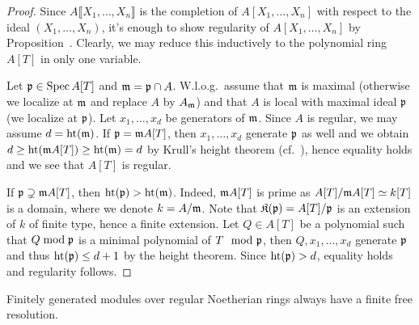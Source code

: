 \documentclass[a4paper,parskip=half,numbers=enddot, DIV=12]{scrreprt}
\begin{document}
\begin{proof}
	Since $A\llbracket X_1,\ldots,X_n\rrbracket$ is the completion of $A[X_1,\ldots,X_n]$ with respect to the ideal $(X_1,\ldots,X_n)$, it's enough to show regularity of $A[X_1,\ldots,X_n]$ by Proposition~. Clearly, we may reduce this inductively to the polynomial ring $A[T]$ in only one variable. 
	
	Let $\mathfrak{p}\in\operatorname{Spec} A[T]$ and $\mathfrak{m}=\mathfrak{p}\cap A$. W.l.o.g.\ assume that $\mathfrak{m}$ is maximal (otherwise we localize at $\mathfrak{m}$ and replace $A$ by $A_{\mathfrak{m}}$) and that $A$ is local with maximal ideal $\mathfrak{p}$ (we localize at $\mathfrak{p}$). Let $x_1,\ldots,x_d$ be generators of $\mathfrak{m}$. Since $A$ is regular, we may assume $d=\operatorname{ht}(\mathfrak{m})$. If $\mathfrak{p}=\mathfrak{m} A[T]$, then $x_1,\ldots,x_d$ generate $\mathfrak{p}$ as well and we obtain $d\geq \operatorname{ht}(\mathfrak{m} A[T])\geq\operatorname{ht}(\mathfrak{m})=d$ by Krull's height theorem (cf.\ \cite[Theorem~12]{alg2}), hence equality holds and we see that $A[T]$ is regular.
	
	If $\mathfrak{p}\supsetneq \mathfrak{m} A[T]$, then $\operatorname{ht}(\mathfrak{p})>\operatorname{ht}(\mathfrak{m})$. Indeed, $\mathfrak{m} A[T]$ is prime as $A[T]/\mathfrak{m} A[T]\simeq k[T]$ is a domain, where we denote $k=A/\mathfrak{m}$. Note that $\mathfrak{K}(\mathfrak{p})=A[T]/\mathfrak{p}$ is an extension of $k$ of finite type, hence a finite extension. Let $Q\in A[T]$ be a polynomial such that $Q\bmod \mathfrak{p}$ is a minimal polynomial of $T\mod{\mathfrak{p}}$, then $Q,x_1,\ldots,x_d$ generate $\mathfrak{p}$ and thus $\operatorname{ht}(\mathfrak{p})\leq d+1$ by the height theorem. Since $\operatorname{ht}(\mathfrak{p})>d$, equality holds and regularity follows.
\end{proof}
\begin{prop}
	Finitely generated modules over regular Noetherian rings always have a finite free resolution.
\end{prop}
\end{document}
